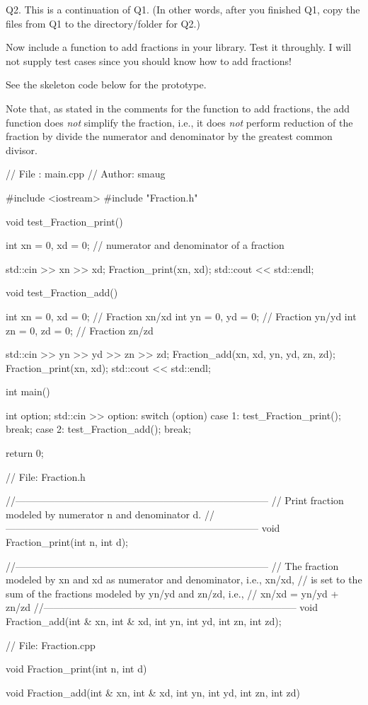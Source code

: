 
Q2. This is a continuation of Q1.
(In other words, after you finished Q1, copy the files from Q1
to the directory/folder for Q2.)

Now include a function to add fractions in your library.
Test it throughly.
I will not supply test cases since you should know how to add fractions!

See the skeleton code below for the prototype.

Note that, as stated in the comments for the function to add fractions,
the add function does \textit{not} simplify the fraction, i.e.,
it does \textit{not} perform reduction of the fraction
by divide the numerator and denominator by the greatest common divisor.

{\small
\begin{console}
// File  : main.cpp
// Author: smaug

#include <iostream>
#include "Fraction.h"

void test_Fraction_print()
{
    int xn = 0, xd = 0; // numerator and denominator of a fraction

    std::cin >> xn >> xd;
    Fraction_print(xn, xd);
    std::cout << std::endl;
}


void test_Fraction_add()
{
    int xn = 0, xd = 0; // Fraction xn/xd
    int yn = 0, yd = 0; // Fraction yn/yd
    int zn = 0, zd = 0; // Fraction zn/zd

    std::cin >> yn >> yd >> zn >> zd;
    Fraction_add(xn, xd, yn, yd, zn, zd);
    Fraction_print(xn, xd);
    std::cout << std::endl;
}


int main()
{
    int option;
    std::cin >> option:
    switch (option)
    {
        case 1:
            test_Fraction_print();
            break;
        case 2:
            test_Fraction_add();
            break;
    }
    
    return 0;
}

\end{console}
\begin{console}
// File: Fraction.h

//-----------------------------------------------------------------------------
// Print fraction modeled by numerator n and denominator d.
//-----------------------------------------------------------------------------
void Fraction_print(int n, int d);

//-----------------------------------------------------------------------------
// The fraction modeled by xn and xd as numerator and denominator, i.e., xn/xd,
// is set to the sum of the fractions modeled by yn/yd and zn/zd, i.e.,
// xn/xd = yn/yd + zn/zd 
//-----------------------------------------------------------------------------
void Fraction_add(int & xn, int & xd,
                  int yn, int yd,
                  int zn, int zd);
\end{console}
\begin{console}
// File: Fraction.cpp

void Fraction_print(int n, int d)
{
}


void Fraction_add(int & xn, int & xd,
                  int yn, int yd,
                  int zn, int zd)
{
}
\end{console}
}





